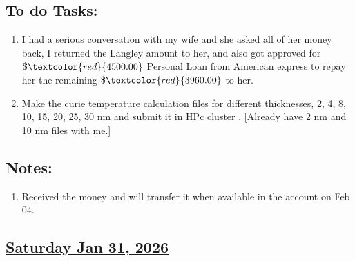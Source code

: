 \subsection*{To do Tasks:}
\begin{enumerate}
    \item I had a serious conversation with my wife and she asked all of her money back, I returned the Langley amount to her, and also got approved for $\$ \textcolor{red}{4500.00}$ Personal Loan from American express to repay her the remaining $\$\textcolor{red}{3960.00}$ to her. \cmark
    \item Make the curie temperature calculation files for different thicknesses, 2, 4, 8, 10, 15, 20, 25, 30 nm and submit it in HPc cluster . [Already have 2 nm and 10 nm files with me.] \cmark
\end{enumerate}
\subsection*{Notes:}
\begin{enumerate}
    \item Received the money and will transfer it when available in the account on Feb 04. 
\end{enumerate}
\subsection*{\underline{Saturday Jan 31, 2026} }
